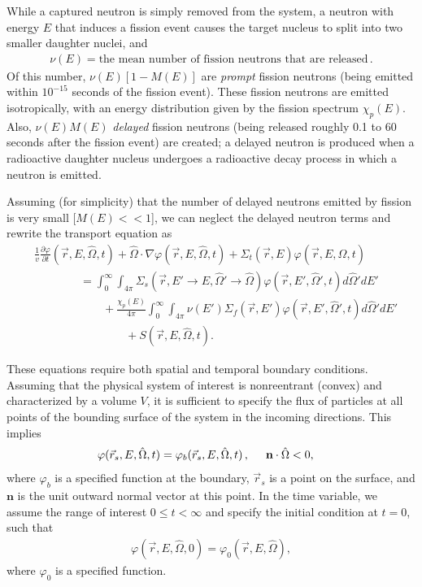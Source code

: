 \documentclass[12pt]{article}
\newcommand{\rvec}{\ensuremath{\vec{r}}}
\newcommand{\omvec}{\ensuremath{\hat{\Omega}}}
\begin{document}
While a captured neutron is simply removed from the system, a neutron with energy $E$ that induces a fission event causes the target nucleus to split into two smaller daughter nuclei, and 
\begin{align*}
\nu(E) = \textrm{the mean number of fission neutrons that are released}\,.
\end{align*}
Of this number, $\nu(E)[1-M(E)]$ are \textit{prompt} fission neutrons (being emitted within $10^{-15}$ seconds of the fission event). These fission neutrons are emitted isotropically, with an energy distribution given by the fission spectrum $\chi_p(E)$. Also, $\nu(E)M(E)$ \textit{delayed} fission neutrons (being released roughly 0.1 to 60 seconds after the fission event) are created; a delayed neutron is produced when a radioactive daughter nucleus undergoes a radioactive decay process in which a neutron is emitted. 

Assuming (for simplicity) that the number of delayed neutrons emitted by fission is very small [$M(E)<<1$], we can neglect the delayed neutron terms and rewrite
the transport equation as
\begin{align}
&\frac{1}{v}\frac{\partial \varphi}{\partial t}(\rvec,E,\omvec,t) + \omvec\cdot  \nabla \varphi(\rvec,E,\omvec,t) +
 \Sigma_t(\rvec,E)\varphi(\rvec,E,\omvec,t) 
\\& \quad\quad\quad\quad =
\int_0^{\infty}\int_{4\pi}\Sigma_s(\rvec, E'\rightarrow E,\omvec'\rightarrow\omvec)
\varphi(\rvec,E',\omvec',t)d\omvec'dE'\nonumber
\\&\quad\quad\quad\quad\quad\quad +\frac{\chi_p(E)}{4\pi}\int_0^{\infty}\int_{4\pi}\nu(E')\Sigma_f(\rvec,E')
\varphi(\rvec,E',\omvec',t)d\omvec'dE'\nonumber
\\&\quad\quad\quad\quad\quad\quad\quad\quad+S(\rvec, E, \omvec,t) \nonumber.
\end{align}
   
These equations require both spatial and temporal boundary conditions.
Assuming that the
physical
system of interest is nonreentrant (convex) and characterized by a
volume $V$, it is sufficient to specify the flux of
particles at all points of the bounding surface of the system in the incoming
directions. This implies
\begin{align*}
\varphi(\rvec_s, E,\omvec,t) &= \varphi_b(\rvec_s,E,\omvec,t)\,, \hspace{0.5 cm} \textbf{n} \cdot \omvec <0,
\end{align*}
 where $\varphi_b$ is a specified function at the boundary, $\rvec_s$ is a point on the surface, and $\textbf{n}$ is the unit
outward normal vector at this point. In the time variable, we assume the range of
interest $0\leq t<\infty$ and specify the
initial condition at $t=0$, such that
\begin{align*}
\varphi(\rvec,E,\omvec,0) = \varphi_0(\rvec,E,\omvec),
\end{align*}
 where $\varphi_0$ is a specified function.
 
\end{document}
